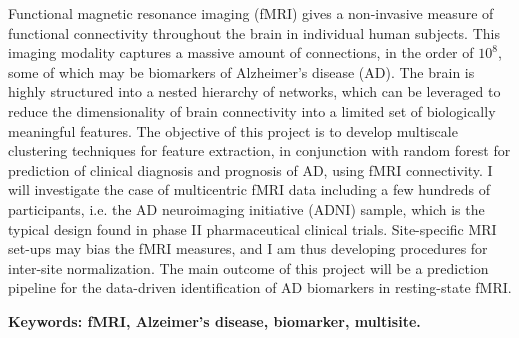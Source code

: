 \abstract

Functional magnetic resonance imaging (fMRI) gives a non-invasive measure of functional connectivity throughout the brain in individual human subjects. This imaging modality captures a massive amount of connections, in the order of $10^8$, some of which may be biomarkers of Alzheimer's disease (AD). The brain is highly structured into a nested hierarchy of networks, which can be leveraged to reduce the dimensionality of brain connectivity into a limited set of biologically meaningful features. The objective of this project is to develop multiscale clustering techniques for feature extraction, in conjunction with random forest for prediction of clinical diagnosis and prognosis of AD, using fMRI connectivity. I will investigate the case of multicentric fMRI data including a few hundreds of participants, i.e. the AD neuroimaging initiative (ADNI) sample, which is the typical design found in phase II pharmaceutical clinical trials. Site-specific MRI set-ups may bias the fMRI measures, and I am thus developing procedures for inter-site normalization. The main outcome of this project will be a prediction pipeline for the data-driven identification of AD biomarkers in resting-state fMRI.



{\bfseries Keywords: fMRI, Alzeimer's disease, biomarker, multisite.}
